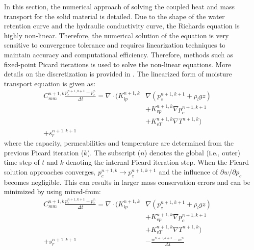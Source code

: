 In this section, the numerical approach of solving the coupled heat and mass transport for the solid material is detailed. Due to the shape of the water retention curve and the hydraulic conductivity curve, the Richards equation is highly non-linear. Therefore, the numerical solution of the equation is very sensitive to convergence tolerance and requires linearization techniques to maintain accuracy and computational efficiency. Therefore, methods such as fixed-point Picard iterations is used to solve the non-linear equations. More details on the discretization is provided in \cite{Liu2012,Janssen2002,Kubilay2018}. The linearized form of moisture transport equation is given as:
\begin{equation}
\begin{split}
C^{n+1,k}_{\textit{mm}}\frac{p_c^{n+1,k+1}-p_c^{n}}{\Delta t} = \nabla \cdot \Big( K_{\textit{lp}}^{n+1,k} &\nabla \left(p_c^{n+1,k+1} + \rho_l g z\right)\\
&+ K_{\textit{vp}}^{n+1,k} \nabla p_c^{n+1,k+1} \\
&+ K_{vT}^{n+1,k} \nabla T^{n+1,k}\Big)\\
+ s_r^{n+1,k+1}&
\end{split}
\end{equation}
where the capacity, permeabilities and temperature are determined from the previous Picard iteration ($k$). The subscript ($n$) denotes the global (i.e., outer) time step of $t$ and $k$ denoting the internal Picard iteration step. When the Picard solution approaches converges, $p_c^{n+1,k} \rightarrow p_c^{n+1,k+1}$ and the influence of $\partial{w}/\partial p_c$ becomes negligible. This can results in larger mass conservation errors and can be minimized by using mixed-from:
\begin{equation}
\begin{split}
C^{n+1,k}_{\textit{mm}}\frac{p_c^{n+1,k+1}-p_c^{n}}{\Delta t} = \nabla \cdot \Big( K_{\textit{lp}}^{n+1,k} &\nabla \left(p_c^{n+1,k+1} + \rho_l g z\right)\\
&+ K_{\textit{vp}}^{n+1,k} \nabla p_c^{n+1,k+1} \\
&+ K_{vT}^{n+1,k} \nabla T^{n+1,k}\Big)\\
+ s_r^{n+1,k+1} &- \frac{w^{n+1,k+1}-w^n}{\Delta t}
\end{split}
\end{equation}

